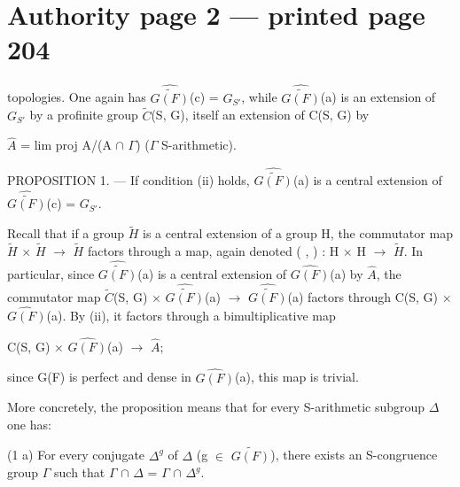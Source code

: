 \documentclass[10pt,a4paper]{article}
\begin{document}
\section*{Authority page 2 --- printed page 204}
\noindent topologies. One again has \ensuremath{\widehat{\widetilde{G(F)}}}(c) = \ensuremath{G_{S′}}, while \ensuremath{\widehat{\widetilde{G(F)}}}(a) is an extension of \ensuremath{G_{S′}} by a profinite group \ensuremath{\widetilde{C}}(S, G), itself an extension of C(S, G) by\par
\smallskip
\noindent \ensuremath{\widehat{A}} = lim proj A/(A \ensuremath{∩} \ensuremath{Γ})    (\ensuremath{Γ} S-arithmetic).\par
\smallskip
\noindent PROPOSITION 1. — If condition (ii) holds, \ensuremath{\widehat{\widetilde{G(F)}}}(a) is a central extension of \ensuremath{\widehat{\widetilde{G(F)}}}(c) = \ensuremath{G_{S′}}.\par
\smallskip
\noindent Recall that if a group \ensuremath{\widetilde{H}} is a central extension of a group H, the commutator map \ensuremath{\widetilde{H}} \ensuremath{×} \ensuremath{\widetilde{H}} \ensuremath{→} \ensuremath{\widetilde{H}} factors through a map, again denoted ( , ) : H \ensuremath{×} H \ensuremath{→} \ensuremath{\widetilde{H}}. In particular, since \ensuremath{\widehat{\widetilde{G(F)}}}(a) is a central extension of \ensuremath{\widehat{G(F)}}(a) by \ensuremath{\widehat{A}}, the commutator map \ensuremath{\widetilde{C}}(S, G) \ensuremath{×} \ensuremath{\widehat{\widetilde{G(F)}}}(a) \ensuremath{→} \ensuremath{\widehat{\widetilde{G(F)}}}(a) factors through C(S, G) \ensuremath{×} \ensuremath{\widehat{G(F)}}(a). By (ii), it factors through a bimultiplicative map\par
\smallskip
\noindent C(S, G) \ensuremath{×} \ensuremath{\widehat{G(F)}}(a) \ensuremath{→} \ensuremath{\widehat{A}};\par
\smallskip
\noindent since G(F) is perfect and dense in \ensuremath{\widehat{G(F)}}(a), this map is trivial.\par
\smallskip
\noindent More concretely, the proposition means that for every S-arithmetic subgroup \ensuremath{Δ} one has:\par
\smallskip
\noindent (1 a) For every conjugate \ensuremath{Δ^g} of \ensuremath{Δ} (g \ensuremath{∈} \ensuremath{\widetilde{G(F)}}), there exists an S-congruence group \ensuremath{Γ} such that \ensuremath{Γ} \ensuremath{∩} \ensuremath{Δ} = \ensuremath{Γ} \ensuremath{∩} \ensuremath{Δ^g}.\par
\end{document}
